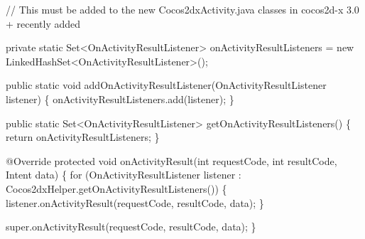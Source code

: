 \begin{DoxyCode}
\textcolor{comment}{// This must be added to the new Cocos2dxActivity.java classes in cocos2d-x 3.0 + recently added}


\textcolor{keyword}{private} \textcolor{keyword}{static} Set<OnActivityResultListener> onActivityResultListeners = \textcolor{keyword}{new} 
      LinkedHashSet<OnActivityResultListener>();


\textcolor{keyword}{public} \textcolor{keyword}{static} \textcolor{keywordtype}{void} addOnActivityResultListener(OnActivityResultListener listener) \{
    onActivityResultListeners.add(listener);
\}

\textcolor{keyword}{public} \textcolor{keyword}{static} Set<OnActivityResultListener> getOnActivityResultListeners() \{
    \textcolor{keywordflow}{return} onActivityResultListeners;
\}



 @Override
    \textcolor{keyword}{protected} \textcolor{keywordtype}{void} onActivityResult(\textcolor{keywordtype}{int} requestCode, \textcolor{keywordtype}{int} resultCode, Intent data)
    \{
        \textcolor{keywordflow}{for} (OnActivityResultListener listener : Cocos2dxHelper.getOnActivityResultListeners()) \{
            listener.onActivityResult(requestCode, resultCode, data);
        \}

        super.onActivityResult(requestCode, resultCode, data);
    \}
\end{DoxyCode}
 